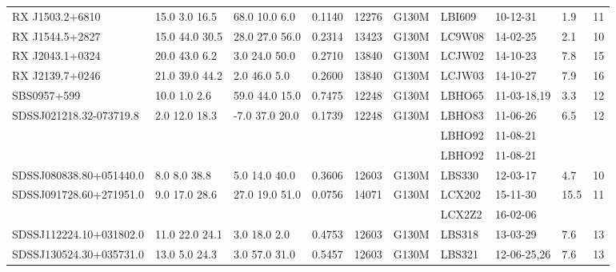 \documentclass[twocolumn,tighten]{aastex6}
\begin{document}
\begin{table}[ht]
\begin{center}
\begin{tabular}{l l l l l l l l l l}
RX J1503.2+6810  &     15.0  3.0  16.5  &    68.0  10.0  6.0     &   0.1140  & 12276  		    &   G130M  &   LBI609    		& 10-12-31 		   &   1.9  &      11         \\
RX J1544.5+2827  &   15.0  44.0  30.5  &   28.0  27.0  56.0    &   0.2314  & 13423  	            &   G130M  &   LC9W08		& 14-02-25		   &   2.1  &      10         \\
RX J2043.1+0324  &     20.0  43.0  6.2  &     3.0  24.0  50.0    &   0.2710  & 13840		    &   G130M  &   LCJW02		& 14-10-23		   &   7.8  &      15         \\
RX J2139.7+0246  &   21.0  39.0  44.2  &      2.0  46.0  5.0     &   0.2600  & 13840  		    &   G130M  &   LCJW03		& 14-10-27  		   & 	7.9  &      16         \\
SBS0957+599         &       10.0  1.0  2.6  &     59.0  44.0  15.0  &    0.7475  & 12248  		    &   G130M  &   LBHO65		& 11-03-18,19  		   &   3.3  &      12         \\
SDSSJ021218.32-073719.8  & 2.0  12.0  18.3  &    -7.0  37.0  20.0  &    0.1739  & 12248  	    &   G130M  &   LBHO83		& 11-06-26		   &   6.5  &      12         \\
				        	     & 	  	  	  	&    		  	       &    	  	 & 	  	    &                 &   LBHO92		& 11-08-21		   &          &                   \\
				        	     & 	  	  	  	&    		  	       &    	  	 & 	  	    &                 &   LBHO92		& 11-08-21		   &          &                   \\
SDSSJ080838.80+051440.0 &   8.0  8.0  38.8  &     5.0  14.0  40.0  &    0.3606  & 12603	    &   G130M  &   LBS330   		& 12-03-17  		   &   4.7  &      10         \\
SDSSJ091728.60+271951.0 & 9.0  17.0  28.6  &    27.0  19.0  51.0 &    0.0756  & 14071	    &   G130M  &   LCX202			& 15-11-30		   & 15.5  &      11         \\
				        	     & 	  	  	        &    		  	       &    	  	 & 	  	    &                 &   LCX2Z2			& 16-02-06		   &          &                   \\
SDSSJ112224.10+031802.0 & 11.0  22.0  24.1 &     3.0  18.0  2.0    &    0.4753  & 12603      &   G130M  &   LBS318			& 13-03-29		   &   7.6  &      13         \\
SDSSJ130524.30+035731.0 & 13.0  5.0  24.3  &    3.0  57.0  31.0   &    0.5457  & 12603	    &   G130M  &   LBS321			& 12-06-25,26		   &   7.6  &      13         \\


\end{tabular}
\end{center}
\end{table}
\end{document}
